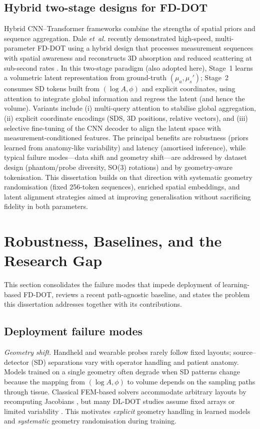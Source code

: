 \subsection{Hybrid two-stage designs for FD-DOT}
Hybrid CNN–Transformer frameworks combine the strengths of spatial priors and sequence aggregation. Dale \emph{et~al.} recently demonstrated high-speed, multi-parameter FD-DOT using a hybrid design that processes measurement sequences with spatial awareness and reconstructs 3D absorption and reduced scattering at sub-second rates \cite{dale2024}. In this two-stage paradigm (also adopted here), Stage~1 learns a volumetric latent representation from ground-truth $(\mu_a,\mu_s')$; Stage~2 consumes SD tokens built from $(\log A,\phi)$ and explicit coordinates, using attention to integrate global information and regress the latent (and hence the volume). Variants include (i) multi-query attention to stabilise global aggregation, (ii) explicit coordinate encodings (SDS, 3D positions, relative vectors), and (iii) selective fine-tuning of the CNN decoder to align the latent space with measurement-conditioned features. The principal benefits are robustness (priors learned from anatomy-like variability) and latency (amortised inference), while typical failure modes—data shift and geometry shift—are addressed by dataset design (phantom/probe diversity, SO(3) rotations) and by geometry-aware tokenisation. This dissertation builds on that direction with systematic geometry randomisation (fixed 256-token sequences), enriched spatial embeddings, and latent alignment strategies aimed at improving generalisation without sacrificing fidelity in both parameters.

\section{Robustness, Baselines, and the Research Gap}
This section consolidates the failure modes that impede deployment of learning-based FD-DOT, reviews a recent path-agnostic baseline, and states the problem this dissertation addresses together with its contributions.

\subsection{Deployment failure modes}

\textit{Geometry shift.} Handheld and wearable probes rarely follow fixed layouts; source–detector (SD) separations vary with operator handling and patient anatomy. Models trained on a single geometry often degrade when SD patterns change because the mapping from $(\log A,\phi)$ to volume depends on the sampling paths through tissue. Classical FEM-based solvers accommodate arbitrary layouts by recomputing Jacobians \cite{arridge1999,dehghani2009}, but many DL-DOT studies assume fixed arrays or limited variability \cite{feng2020,deng2023}. This motivates \emph{explicit} geometry handling in learned models and \emph{systematic} geometry randomisation during training.

